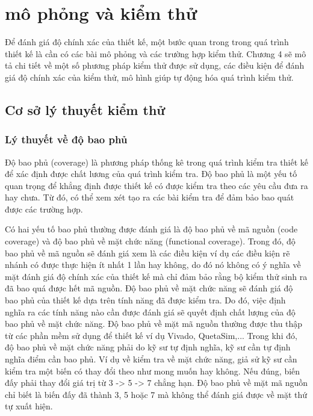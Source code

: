 \clearpage
{}

\setcounter{chapter}{3}
\chapter[{MÔ PHỎNG VÀ KIỂM THỬ}]{mô phỏng và kiểm thử}
Để đánh giá độ chính xác của thiết kế, một bước quan trong trong quá trình thiết kế là cần có các bài mô phỏng và các trường hợp kiểm thử. Chương 4 sẽ mô tả chi tiết về một số phương pháp kiểm thử được sử dụng, các điều kiện để đánh giá độ chính xác của kiểm thử, mô hình giúp tự động hóa quá trình kiểm thử.
\section{Cơ sở lý thuyết kiểm thử}
\subsection{Lý thuyết về độ bao phủ}
Độ bao phủ (coverage) là phương pháp thống kê trong quá trình kiểm tra thiết kế để xác định được chất lương của quá trình kiểm tra. Độ bao phủ là một yếu tố quan trọng để khẳng định được thiết kế có được kiểm tra theo các yêu cầu đưa ra hay chưa. Từ đó, có thể xem xét tạo ra các bài kiểm tra để đảm bảo bao quát được các trường hợp.

Có hai yếu tố bao phủ thường được đánh giá là độ bao phủ về mã nguồn (code coverage) và độ bao phủ về mặt chức năng (functional coverage). Trong đó, độ bao phủ về mã nguồn sẽ đánh giá xem là các điều kiện ví dụ các điều kiện rẽ nhánh có được thực hiện ít nhất 1 lần hay không, do đó nó không có ý nghĩa về mặt đánh giá độ chính xác của thiết kế mà chỉ đảm bảo rằng bộ kiểm thử sinh ra đã bao quá được hết mã nguồn. Độ bao phủ về mặt chức năng sẽ đánh giá độ bao phủ của thiết kế dựa trên tính năng đã được kiểm tra. Do đó, việc định nghĩa ra các tính năng nào cần được đánh giá sẽ quyết định chất lượng của độ bao phủ về mặt chức năng. Độ bao phủ về mặt mã nguồn thường được thu thập từ các phần mềm sử dụng để thiết kế ví dụ Vivado, QuetaSim,... Trong khi đó, độ bao phủ về mặt chức năng phải do kỹ sư tự định nghĩa, kỹ sư cần tự định nghĩa điểm cần bao phủ. Ví dụ về kiểm tra về mặt chức năng, giả sử kỹ sư cần kiểm tra một biến có thay đổi theo như mong muốn hay không. Nếu đúng, biến đấy phải thay đổi giá trị từ 3 -> 5 -> 7 chẳng hạn. Độ bao phủ về mặt mã nguồn chỉ biết là biến đấy đã thành 3, 5 hoặc 7 mà không thể đánh giá được về mặt thứ tự xuất hiện.

